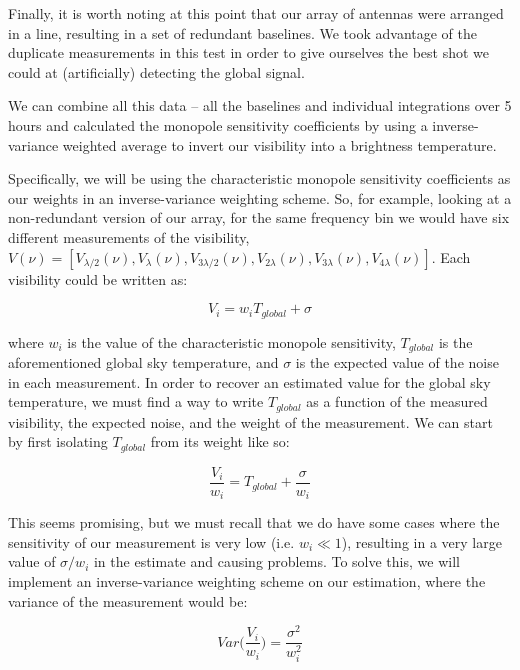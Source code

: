 Finally, it is worth noting at this point that our array of antennas were 
arranged in a line, resulting in a set of redundant baselines. We took 
advantage of the duplicate measurements in this test in order to give ourselves 
the best shot we could at (artificially) detecting the global signal.

We can combine all this data -- all the baselines and individual integrations 
over 5 hours and calculated the monopole sensitivity coefficients by using a 
inverse-variance weighted average to invert our visibility into a brightness 
temperature.

Specifically, we will be using the characteristic monopole sensitivity 
coefficients as our weights in an inverse-variance weighting scheme. So, for 
example, looking at a non-redundant version of our array, for the same 
frequency bin we would have six different measurements of the visibility, 
$V(\nu) = [V_{\lambda/2}(\nu), V_{\lambda}(\nu), V_{3\lambda/2}(\nu), 
V_{2\lambda}(\nu), V_{3\lambda}(\nu), V_{4\lambda}(\nu)]$. Each visibility 
could be written as:

\begin{equation}
    V_i = w_i T_{global} + \sigma
    \label{eq:vis-weight}
\end{equation}

\noindent where $w_i$ is the value of the characteristic monopole sensitivity, 
$T_{global}$ is the aforementioned global sky temperature, and $\sigma$ is the 
expected value of the noise in each measurement. In order to recover an 
estimated value for the global sky temperature, we must find a way to write 
$T_{global}$ as a function of the measured visibility, the expected noise, and 
the weight of the measurement.  We can start by first isolating $T_{global}$ 
from its weight like so:

\begin{equation}
    \frac{V_i}{w_i} = T_{global} + \frac{\sigma}{w_i}
    \label{eq:isolated-temp}
\end{equation}

This seems promising, but we must recall that we do have some cases where the 
sensitivity of our measurement is very low (i.e. $w_i \ll 1$), resulting in a 
very large value of $\sigma/w_i$ in the estimate and causing problems. To solve 
this, we will implement an inverse-variance weighting scheme on our estimation, 
where the variance of the measurement would be:

\begin{equation}
    Var\Big(\frac{V_i}{w_i}\Big) = \frac{\sigma^2}{w_i^2}
    \label{eq:variance}
\end{equation}

